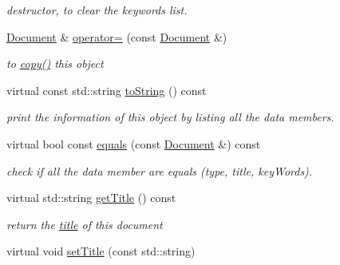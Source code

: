 \begin{DoxyCompactItemize}
\begin{DoxyCompactList}\small\item\em destructor, to clear the keywords list. \end{DoxyCompactList}\item 
\hypertarget{classdocs_1_1Document_ad7026f3128f00be0e80bb9dc7d220da4}{\hyperlink{classdocs_1_1Document}{Document} \& \hyperlink{classdocs_1_1Document_ad7026f3128f00be0e80bb9dc7d220da4}{operator=} (const \hyperlink{classdocs_1_1Document}{Document} \&)}\label{classdocs_1_1Document_ad7026f3128f00be0e80bb9dc7d220da4}

\begin{DoxyCompactList}\small\item\em to \hyperlink{classdocs_1_1Document_ad8b6a91c7a8e39a880790d14aba14322}{copy()} this object \end{DoxyCompactList}\item 
\hypertarget{classdocs_1_1Document_a16db383045038b779eb489ad125ef02b}{virtual const std\-::string \hyperlink{classdocs_1_1Document_a16db383045038b779eb489ad125ef02b}{to\-String} () const }\label{classdocs_1_1Document_a16db383045038b779eb489ad125ef02b}

\begin{DoxyCompactList}\small\item\em print the information of this object by listing all the data members. \end{DoxyCompactList}\item 
\hypertarget{classdocs_1_1Document_ad86b3a7c7d496f3b05c740e2c1433c78}{virtual bool const \hyperlink{classdocs_1_1Document_ad86b3a7c7d496f3b05c740e2c1433c78}{equals} (const \hyperlink{classdocs_1_1Document}{Document} \&) const }\label{classdocs_1_1Document_ad86b3a7c7d496f3b05c740e2c1433c78}

\begin{DoxyCompactList}\small\item\em check if all the data member are equals (type, title, key\-Words). \end{DoxyCompactList}\item 
\hypertarget{classdocs_1_1Document_a06b90f239984c69784c877d670943fb5}{virtual std\-::string \hyperlink{classdocs_1_1Document_a06b90f239984c69784c877d670943fb5}{get\-Title} () const }\label{classdocs_1_1Document_a06b90f239984c69784c877d670943fb5}

\begin{DoxyCompactList}\small\item\em return the \hyperlink{classdocs_1_1Document_a419e4470c20e1bddd60448ba430f4738}{title} of this document \end{DoxyCompactList}\item 
\hypertarget{classdocs_1_1Document_afdf0fd42a3afe3c7c2523b3ee16d09e0}{virtual void \hyperlink{classdocs_1_1Document_afdf0fd42a3afe3c7c2523b3ee16d09e0}{set\-Title} (const std\-::string)}\label{classdocs_1_1Document_afdf0fd42a3afe3c7c2523b3ee16d09e0}


\end{DoxyCompactItemize}
